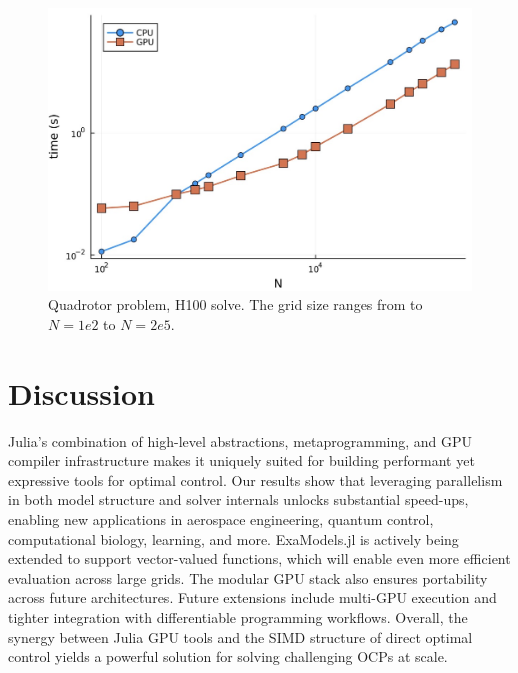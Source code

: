 \begin{figure}
\includegraphics[width=.45\textwidth]{quadrotor-h100.jpg}
\caption{Quadrotor problem, H100 solve. The grid size ranges from to $N = 1e2$ to $N = 2e5$.}
\label{fig4}
\end{figure}


\section{Discussion}
Julia's combination of high-level abstractions, metaprogramming, and GPU compiler infrastructure makes it uniquely suited for building performant yet expressive tools for optimal control. 
Our results show that leveraging parallelism in both model structure and solver internals unlocks substantial speed-ups, enabling new applications in aerospace engineering, quantum control, computational biology, learning, and more. 
ExaModels.jl is actively being extended to support vector-valued functions, which will enable even more efficient evaluation across large grids.
The modular GPU stack also ensures portability across future architectures.
Future extensions include multi-GPU execution and tighter integration with differentiable programming workflows.
Overall, the synergy between Julia GPU tools and the SIMD structure of direct optimal control yields a powerful solution for solving challenging OCPs at scale.

